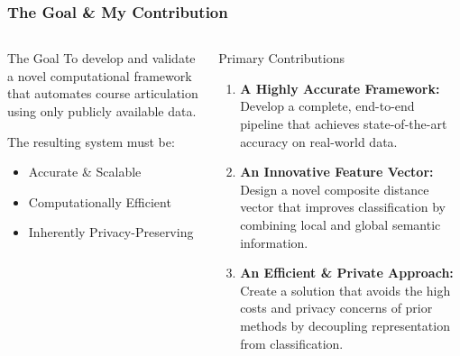 \documentclass[aspectratio=169,10pt]{beamer}
\begin{document}
\begin{frame}
    \fontsize{9}{9}\selectfont
    \frametitle{The Goal \& My Contribution}
    
    \begin{columns}[T]
        \begin{column}{0.45\textwidth}
            \begin{block}{The Goal}
                To develop and validate a novel computational framework that automates course articulation using only publicly available data.
                \vspace{1em}
                
                The resulting system must be:
                \begin{itemize}
                    \item<2-> Accurate \& Scalable
                    \item<3-> Computationally Efficient
                    \item<4-> Inherently Privacy-Preserving
                \end{itemize}
            \end{block}
        \end{column}
        
        \begin{column}{0.45\textwidth}
            \begin{block}{Primary Contributions}
                \begin{enumerate}
                    \item<2-> \textbf{A Highly Accurate Framework:} Develop a complete, end-to-end pipeline that achieves state-of-the-art accuracy on real-world data.
                    \item<3-> \textbf{An Innovative Feature Vector:} Design a novel composite distance vector that improves classification by combining local and global semantic information.
                    \item<4-> \textbf{An Efficient \& Private Approach:} Create a solution that avoids the high costs and privacy concerns of prior methods by decoupling representation from classification.
                \end{enumerate}
            \end{block}
        \end{column}
    \end{columns}
    

\end{frame}
\end{document}
